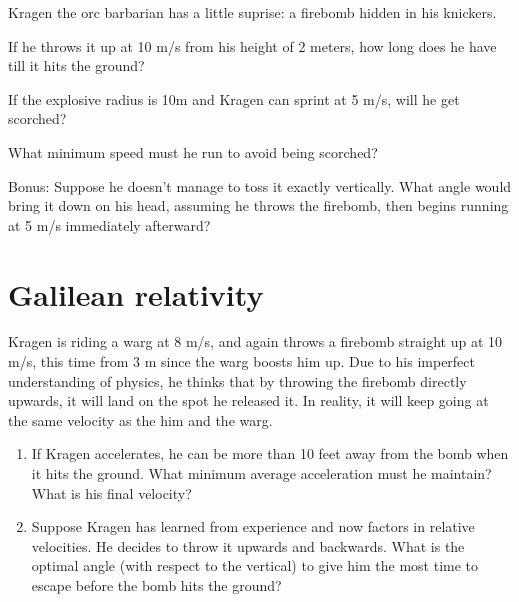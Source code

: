 \documentclass[12pt,letterpaper]{article}
\begin{document}
Kragen the orc barbarian has a little suprise:
a firebomb hidden in his knickers.

If he throws it up at 10 m/s from his height of 2 meters,
how long does he have till it hits the ground?

If the explosive radius is 10m and Kragen can sprint at 5 m/s, will he get scorched?

What minimum speed must he run to avoid being scorched?

Bonus:
Suppose he doesn't manage to toss it exactly vertically. 
What angle would bring it down on his head,
assuming he throws the firebomb,
then begins running at 5 m/s immediately afterward?

\section{Galilean relativity}

Kragen is riding a warg at 8 m/s,
and again throws a firebomb straight up at 10 m/s,
this time from 3 m since the warg boosts him up.
Due to his imperfect understanding of physics,
he thinks that by throwing the firebomb directly upwards,
it will land on the spot he released it.
In reality, it will keep going at the same velocity as the him and the warg.

\begin{enumerate}
\item If Kragen accelerates, he can be more than 10 feet away from the bomb when it hits the ground. What minimum average acceleration must he maintain? What is his final velocity?
\item Suppose Kragen has learned from experience and now factors in relative velocities. He decides to throw it upwards and backwards. What is the optimal angle (with respect to the vertical) to give him the most time to escape before the bomb hits the ground?
\end{enumerate}
\end{document}
